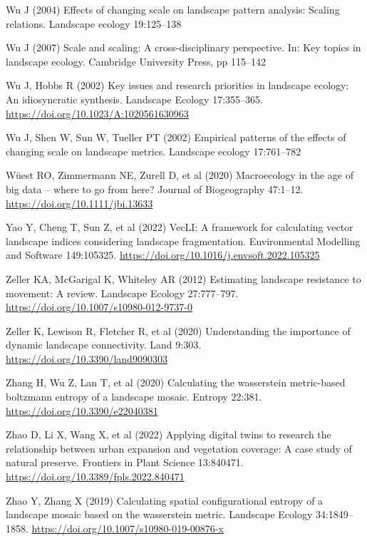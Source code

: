 \documentclass[
  10pt,
  a4paperpaper,
]{article}
\newlength{\cslhangindent}
\newenvironment{CSLReferences}[2] %
 {\begin{list}{}{%
  \setlength{\itemindent}{0pt}
  \setlength{\leftmargin}{0pt}
  \setlength{\parsep}{0pt}
  \ifodd #1
   \setlength{\leftmargin}{\cslhangindent}
   \setlength{\itemindent}{-1\cslhangindent}
  \fi
  \setlength{\itemsep}{#2\baselineskip}}}
 {\end{list}}
\begin{document}
\begin{CSLReferences}{1}{1}
Wu J (2004) Effects of changing scale on landscape pattern analysis:
Scaling relations. Landscape ecology 19:125--138

Wu J (2007) Scale and scaling: A cross-disciplinary perspective. In: Key
topics in landscape ecology. Cambridge University Press, pp 115--142

Wu J, Hobbs R (2002) Key issues and research priorities in landscape
ecology: An idiosyncratic synthesis. Landscape Ecology 17:355--365.
\url{https://doi.org/10.1023/A:1020561630963}

Wu J, Shen W, Sun W, Tueller PT (2002) Empirical patterns of the effects
of changing scale on landscape metrics. Landscape ecology 17:761--782

Wüest RO, Zimmermann NE, Zurell D, et al (2020) Macroecology in the age
of big data -- where to go from here? Journal of Biogeography 47:1--12.
\url{https://doi.org/10.1111/jbi.13633}

Yao Y, Cheng T, Sun Z, et al (2022) VecLI: A framework for calculating
vector landscape indices considering landscape fragmentation.
Environmental Modelling and Software 149:105325.
\url{https://doi.org/10.1016/j.envsoft.2022.105325}

Zeller KA, McGarigal K, Whiteley AR (2012) Estimating landscape
resistance to movement: A review. Landscape Ecology 27:777--797.
\url{https://doi.org/10.1007/s10980-012-9737-0}

Zeller K, Lewison R, Fletcher R, et al (2020) Understanding the
importance of dynamic landscape connectivity. Land 9:303.
\url{https://doi.org/10.3390/land9090303}

Zhang H, Wu Z, Lan T, et al (2020) Calculating the wasserstein
metric-based boltzmann entropy of a landscape mosaic. Entropy 22:381.
\url{https://doi.org/10.3390/e22040381}

Zhao D, Li X, Wang X, et al (2022) Applying digital twins to research
the relationship between urban expansion and vegetation coverage: A case
study of natural preserve. Frontiers in Plant Science 13:840471.
\url{https://doi.org/10.3389/fpls.2022.840471}

Zhao Y, Zhang X (2019) Calculating spatial configurational entropy of a
landscape mosaic based on the wasserstein metric. Landscape Ecology
34:1849--1858. \url{https://doi.org/10.1007/s10980-019-00876-x}

\end{CSLReferences}

\endgroup
\end{document}
